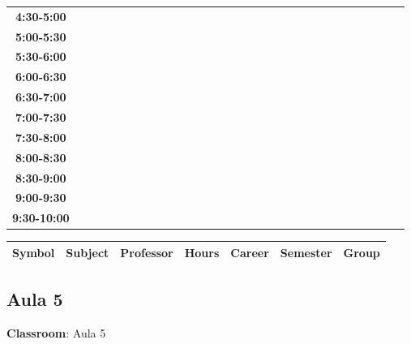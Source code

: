 \documentclass{article}
\begin{document}
\begin{table}[ht]
\begin{tabular}{|c|c|c|c|c|c|c|c|c|c|c|c|c|c|c|c|c|c|c|c|c|c|c|c|c|c|c|c|c|c|}
 \cline{1-8} 
\textbf{4:30-5:00} &   &   &   &   &   &   &   \\
 \cline{1-8} 
\textbf{5:00-5:30} &   &   &   &   &   &   &   \\
 \cline{1-8} 
\textbf{5:30-6:00} &   &   &   &   &   &   &   \\
 \cline{1-8} 
\textbf{6:00-6:30} &   &   &   &   &   &   &   \\
 \cline{1-8} 
\textbf{6:30-7:00} &   &   &   &   &   &   &   \\
 \cline{1-8} 
\textbf{7:00-7:30} &   &   &   &   &   &   &   \\
 \cline{1-8} 
\textbf{7:30-8:00} &   &   &   &   &   &   &   \\
 \cline{1-8} 
\textbf{8:00-8:30} &   &   &   &   &   &   &   \\
 \cline{1-8} 
\textbf{8:30-9:00} &   &   &   &   &   &   &   \\
 \cline{1-8} 
\textbf{9:00-9:30} &   &   &   &   &   &   &   \\
 \cline{1-8} 
\textbf{9:30-10:00} &   &   &   &   &   &   &   \\
 \cline{1-8} 
\end{tabular}\end{table}

        
        \begin{tabular}{|>{\centering\arraybackslash}m{2cm}|>{\centering\arraybackslash}m{4cm}|>{\centering\arraybackslash}m{2.15cm}|>{\centering\arraybackslash}m{1.8cm}|>{\centering\arraybackslash}m{2cm}|>{\centering\arraybackslash}m{2cm}|>{\centering\arraybackslash}m{2cm}|}
        \hline
        \textbf{Symbol} & \textbf{Subject} & \textbf{Professor} & \textbf{Hours} & \textbf{Career} & \textbf{Semester} & \textbf{Group} \\
        \hline
        \end{tabular}
                    

        \newpage
        

        \subsection{Aula 5}
        \vspace*{.1cm}
        
        \begin{flushright}
            {\LARGE \textbf{Classroom}: Aula 5}
        \end{flushright}
        \vspace{1cm}
\end{document}
